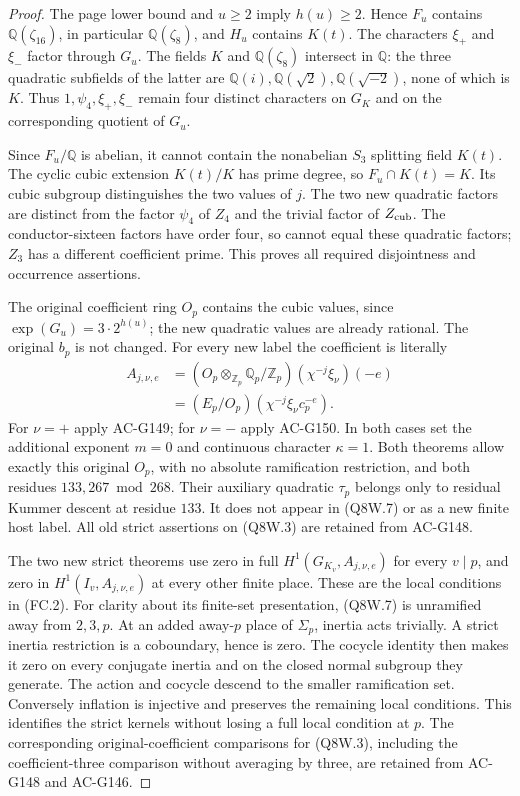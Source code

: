 \begin{proof}
The page lower bound and $u\geq2$ imply $h(u)\geq2$.
Hence $F_u$ contains $\mathbb Q(\zeta_{16})$, in particular
$\mathbb Q(\zeta_8)$, and $H_u$ contains $K(t)$.
The characters $\xi_+$ and $\xi_-$ factor through $G_u$.
The fields $K$ and $\mathbb Q(\zeta_8)$ intersect in $\mathbb Q$:
the three quadratic subfields of the latter are
$\mathbb Q(i),\mathbb Q(\sqrt2),\mathbb Q(\sqrt{-2})$,
none of which is $K$.
Thus $1,\psi_4,\xi_+,\xi_-$ remain four distinct characters
on $G_K$ and on the corresponding quotient of $G_u$.

Since $F_u/\mathbb Q$ is abelian, it cannot contain the
nonabelian $S_3$ splitting field $K(t)$.
The cyclic cubic extension $K(t)/K$ has prime degree, so
$F_u\cap K(t)=K$.
Its cubic subgroup distinguishes the two values of $j$.
The two new quadratic factors are distinct from the factor $\psi_4$
of $Z_4$ and the trivial factor of $Z_{\rm cub}$.
The conductor-sixteen factors have order four, so cannot equal
these quadratic factors; $Z_3$ has a different coefficient prime.
This proves all required disjointness and occurrence assertions.

The original coefficient ring $O_p$ contains the cubic values,
since $\exp(G_u)=3\cdot2^{h(u)}$; the new quadratic values are
already rational.  The original $b_p$ is not changed.
For every new label the coefficient is literally
\[
 \begin{aligned}
 A_{j,\nu,e}&=(O_p\otimes_{\mathbb Z_p}\mathbb Q_p/\mathbb Z_p)
                (\chi^{-j}\xi_\nu)(-e)\\
       &=(E_p/O_p)(\chi^{-j}\xi_\nu c_p^{-e}).
 \end{aligned}
 \tag{Q8W.7}
\]
For $\nu=+$ apply AC-G149; for $\nu=-$ apply AC-G150.
In both cases set the additional exponent $m=0$ and continuous
character $\kappa=1$.
Both theorems allow exactly this original $O_p$, with no absolute
ramification restriction, and both residues $133,267\bmod268$.
Their auxiliary quadratic $\tau_p$ belongs only to residual
Kummer descent at residue $133$.
It does not appear in (Q8W.7) or as a new finite host label.
All old strict assertions on (Q8W.3) are retained from AC-G148.

The two new strict theorems use zero in full
$H^1(G_{K_v},A_{j,\nu,e})$ for every $v\mid p$, and zero
in $H^1(I_v,A_{j,\nu,e})$ at every other finite place.
These are the local conditions in (FC.2).
For clarity about its finite-set presentation, (Q8W.7) is
unramified away from $2,3,p$.
At an added away-$p$ place of $\Sigma_p$, inertia acts trivially.
A strict inertia restriction is a coboundary, hence is zero.
The cocycle identity then makes it zero on every conjugate inertia
and on the closed normal subgroup they generate.
The action and cocycle descend to the smaller ramification set.
Conversely inflation is injective and preserves the remaining
local conditions.  This identifies the strict kernels without
losing a full local condition at $p$.
The corresponding original-coefficient comparisons for (Q8W.3),
including the coefficient-three comparison without averaging by
three, are retained from AC-G148 and AC-G146.


\end{proof}
